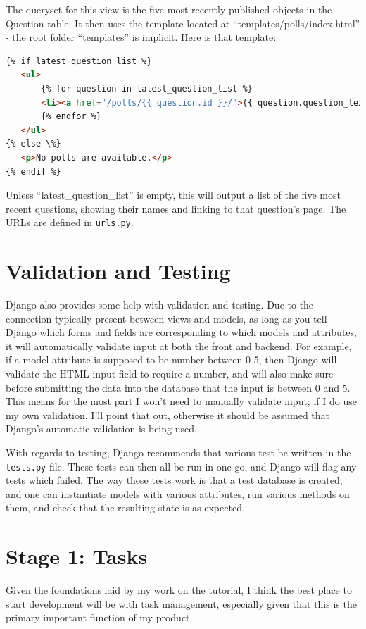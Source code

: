 \documentclass{article}
\begin{document}
The queryset for this view is the five most recently published objects in the Question table.
It then uses the template located at ``templates/polls/index.html'' -
the root folder ``templates'' is implicit.
Here is that template:
\begin{lstlisting}[language=HTML]
{% if latest_question_list %}
   <ul>
       {% for question in latest_question_list %}
       <li><a href="/polls/{{ question.id }}/">{{ question.question_text }}</a></li>
       {% endfor %}
   </ul>
{% else \%}
   <p>No polls are available.</p>
{% endif %}
\end{lstlisting}

Unless ``latest\_question\_list'' is empty,
this will output a list of the five most recent questions,
showing their names and linking to that question's page.
The URLs are defined in \texttt{urls.py}.

\section{Validation and Testing}
Django also provides some help with validation and testing.
Due to the connection typically present between views and models,
as long as you tell Django which forms and fields are corresponding to which models and attributes,
it will automatically validate input at both the front and backend.
For example, if a model attribute is supposed to be number between 0-5,
then Django will validate the HTML input field to require a number,
and will also make sure before submitting the data into the database that the input is between 0 and 5.
This means for the most part I won't need to manually validate input;
if I do use my own validation, I'll point that out,
otherwise it should be assumed that Django's automatic validation is being used.

With regards to testing,
Django recommends that various test be written in the \texttt{tests.py} file.
These tests can then all be run in one go,
and Django will flag any tests which failed.
The way these tests work is that a test database is created,
and one can instantiate models with various attributes,
run various methods on them,
and check that the resulting state is as expected.

\section{Stage 1: Tasks}
Given the foundations laid by my work on the tutorial,
I think the best place to start development will be with task management,
especially given that this is the primary important function of my product.
\end{document}
